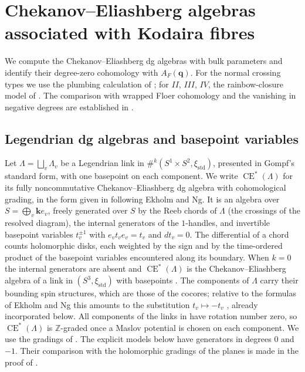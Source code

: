 \documentclass[a4paper]{amsart}
\newcommand{\kk}{\mathbf{k}}
\newcommand{\ZZ}{\mathbb{Z}}
\DeclareMathOperator{\CE}{CE}
\numberwithin{equation}{section}
\begin{document}
\section{Chekanov--Eliashberg algebras associated with Kodaira fibres}
\label{sec:algebras}

We compute the Chekanov--Eliashberg dg algebras with bulk parameters
and identify their degree-zero cohomology with $A_F(\boldsymbol q)$.
For the normal crossing types we use the plumbing calculation of
\cite{ELplumbing}; for $II$, $III$, $IV$, the rainbow-closure model of
\cite{CSrainbow}. The comparison with wrapped Floer cohomology and the
vanishing in negative degrees are established in
.

\subsection{Legendrian dg algebras and basepoint variables}
\label{subsec:ce-conventions}

Let $\Lambda=\bigsqcup_{v}\Lambda_v$ be a Legendrian link in
$\#^k(S^1\times S^2,\xi_{\mathrm{std}})$, presented in Gompf's standard
form, with one basepoint on each component. We write
$\CE^*(\Lambda)$ for its fully noncommutative Chekanov--Eliashberg dg
algebra with cohomological grading, in the form given in
\cite[Section~2]{ELplumbing} following Ekholm and Ng. It is an
algebra over $S=\bigoplus_v\kk e_v$, freely generated over $S$ by the
Reeb chords of $\Lambda$ (the crossings of the resolved diagram), the
internal generators of the $1$-handles, and invertible basepoint
variables $t_v^{\pm1}$ with $e_vt_ve_v=t_v$ and $dt_v=0$. The
differential of a chord counts holomorphic disks, each weighted by the
sign and by the time-ordered product of the basepoint variables
encountered along its boundary. When $k=0$ the internal generators are
absent and $\CE^*(\Lambda)$ is the Chekanov--Eliashberg algebra of a link
in $(S^3,\xi_{\mathrm{std}})$ with basepoints \cite[Section~2.1]{CSrainbow}.
The components of $\Lambda$ carry their bounding spin structures, which
are those of the cocores; relative to the formulas of Ekholm and Ng
this amounts to the substitution $t_v\mapsto-t_v$
\cite[footnote~2]{ELplumbing}, already incorporated below. All
components of the links in  have
rotation number zero, so $\CE^*(\Lambda)$ is $\ZZ$-graded once a Maslov
potential is chosen on each component. We use the gradings of
\cite{ELplumbing,CSrainbow}. The explicit models below have generators
in degrees $0$ and $-1$. Their comparison with the holomorphic gradings
of the planes is made in the proof of .
\end{document}
